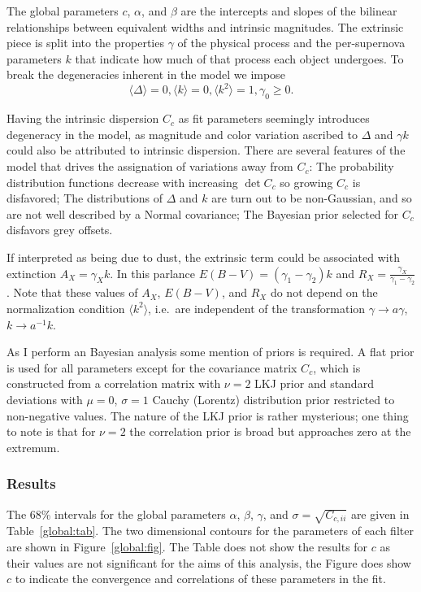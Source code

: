 \documentclass[11pt, oneside]{article}   	%
\begin{document}
The global parameters $c$, $\alpha$, and $\beta$ are the intercepts and slopes of the bilinear relationships between equivalent widths
and intrinsic magnitudes.  The extrinsic piece is split into the properties $\gamma$ of the physical process and the per-supernova 
parameters $k$ that indicate how much of that process each object undergoes.  To break the degeneracies inherent in the model we impose
\begin{equation*}
\langle \Delta \rangle=0, \langle k \rangle=0, \langle k^2 \rangle=1, \gamma_0 \ge 0.
\end{equation*}

Having the intrinsic dispersion $C_c$ as fit parameters seemingly introduces degeneracy in the model, as magnitude and color variation
ascribed to $\Delta$ and $\gamma k$ could also be attributed to intrinsic dispersion.  There are several features of the model
that drives the assignation of variations away from $C_c$:  The probability distribution functions decrease
with increasing $\det{C_c}$ so growing $C_c$ is disfavored; The distributions of $\Delta$ and $k$ are turn out to
be non-Gaussian, and so are not well described by a Normal covariance; The Bayesian prior selected for $C_c$ disfavors
grey offsets.

If interpreted as being due to dust, the extrinsic term could be associated with extinction $A_X = \gamma_X k$.  In
this parlance $E(B-V) = (\gamma_1-\gamma_2) k$ and $R_X = \frac{\gamma_X}{\gamma_1-\gamma_2}$.
Note that these values of $A_X$, $E(B-V)$, and $R_X$ do not depend on the normalization condition $ \langle k^2 \rangle$, i.e.\
are independent of the transformation $\gamma \rightarrow a\gamma$, $k \rightarrow a^{-1} k$.

As I perform an Bayesian analysis some mention of priors is required.  A flat prior is used for all parameters except
for the covariance matrix $C_c$, which is constructed from a correlation matrix with  $\nu=2$  LKJ prior and standard
deviations with
 $\mu=0$, $\sigma=1$ Cauchy (Lorentz) distribution prior restricted to non-negative values.
The nature of the LKJ prior is rather mysterious; one thing to note is that for $\nu=2$ the correlation prior is broad but
approaches zero at the extremum.

\subsubsection{Results}
The 68\% intervals for the global parameters $\alpha$, $\beta$, $\gamma$, and $\sigma = \sqrt{C_{c,ii}}$  are given in Table~\ref{global:tab}.
The two dimensional contours for the parameters of each filter are shown in Figure~\ref{global:fig}.  The Table does not show
the results for $c$ as their values are not significant for the aims of this analysis, the Figure does show $c$ to indicate the convergence
and correlations of these parameters in the fit.
\end{document}
